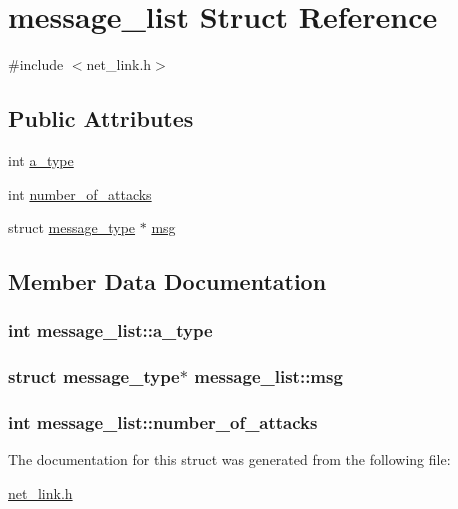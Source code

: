 \hypertarget{structmessage__list}{\section{message\-\_\-list Struct Reference}
\label{structmessage__list}
}


{\ttfamily \#include $<$net\-\_\-link.\-h$>$}

\subsection*{Public Attributes}
\begin{DoxyCompactItemize}
\item 
int \hyperlink{structmessage__list_a74fceaced03e336bdf83ca08d63515ab}{a\-\_\-type}
\item 
int \hyperlink{structmessage__list_a2484b3f342cb61930c1c7dd58b13af39}{number\-\_\-of\-\_\-attacks}
\item 
struct \hyperlink{structmessage__type}{message\-\_\-type} $\ast$ \hyperlink{structmessage__list_aa9f384ba025827ef0a3ec15d6b78a478}{msg}
\end{DoxyCompactItemize}


\subsection{Member Data Documentation}
\hypertarget{structmessage__list_a74fceaced03e336bdf83ca08d63515ab}{
\subsubsection[{a\-\_\-type}]{\setlength{\rightskip}{0pt plus 5cm}int message\-\_\-list\-::a\-\_\-type}}\label{structmessage__list_a74fceaced03e336bdf83ca08d63515ab}
\hypertarget{structmessage__list_aa9f384ba025827ef0a3ec15d6b78a478}{
\subsubsection[{msg}]{\setlength{\rightskip}{0pt plus 5cm}struct {\bf message\-\_\-type}$\ast$ message\-\_\-list\-::msg}}\label{structmessage__list_aa9f384ba025827ef0a3ec15d6b78a478}
\hypertarget{structmessage__list_a2484b3f342cb61930c1c7dd58b13af39}{
\subsubsection[{number\-\_\-of\-\_\-attacks}]{\setlength{\rightskip}{0pt plus 5cm}int message\-\_\-list\-::number\-\_\-of\-\_\-attacks}}\label{structmessage__list_a2484b3f342cb61930c1c7dd58b13af39}


The documentation for this struct was generated from the following file\-:\begin{DoxyCompactItemize}
\item 
\hyperlink{net__link_8h}{net\-\_\-link.\-h}\end{DoxyCompactItemize}
